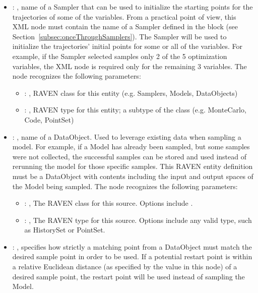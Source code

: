 \begin{itemize}
    \item {}: ,
      name of a Sampler that can be used to initialize the starting points for the trajectories
      of some of the variables. From a practical point of view, this XML node must contain the
      name of a Sampler defined in the  block (see
      Section~\ref{subsec:onceThroughSamplers}).               The Sampler will be used to
      initialize the trajectories' initial points for some or all               of the variables.
      For example, if the Sampler selected samples only 2 of the 5 optimization
      variables, the  XML node is required only for the remaining 3 variables.
      The  node recognizes the following parameters:
        \begin{itemize}
          \item {}: ,
            RAVEN class for this entity (e.g. Samplers, Models, DataObjects)
          \item {}: ,
            RAVEN type for this entity; a subtype of the class (e.g. MonteCarlo, Code, PointSet)
      \end{itemize}

    \item {}: ,
      name of a DataObject. Used to leverage existing data when sampling a model. For
      example, if a Model has               already been sampled, but some samples were not
      collected, the successful samples can               be stored and used instead of rerunning
      the model for those specific samples. This RAVEN               entity definition must be a
      DataObject with contents including the input and output spaces               of the Model
      being sampled.
      The  node recognizes the following parameters:
        \begin{itemize}
          \item {}: ,
            The RAVEN class for this source. Options include .
          \item {}: ,
            The RAVEN type for this source. Options include any valid  type,
            such as HistorySet or PointSet.
      \end{itemize}

    \item {}: ,
      specifies how strictly a matching point from a  DataObject must match
      the desired sample point in order to be used. If a potential restart point is within a
      relative Euclidean distance (as specified by the value in this node) of a desired sample
      point,               the restart point will be used instead of sampling the Model.


\end{itemize}
